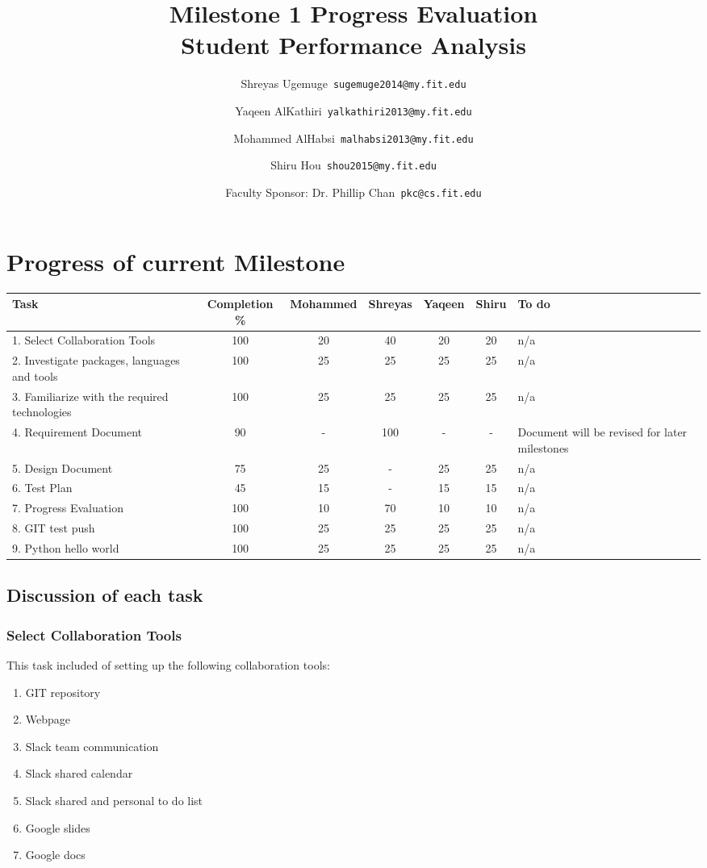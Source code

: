 \documentclass[12pt]{article}
\begin{document}
	\title{\textbf{Milestone 1 Progress Evaluation} \\ \hfill \break
	Student Performance Analysis}
	\author{Shreyas Ugemuge\      \texttt{sugemuge2014@my.fit.edu}
  \and
  Yaqeen AlKathiri\      \texttt{yalkathiri2013@my.fit.edu}
  \and
	Mohammed AlHabsi\      \texttt{malhabsi2013@my.fit.edu}
  \and
  Shiru Hou\      \texttt{shou2015@my.fit.edu}
  \and
  Faculty Sponsor: Dr. Phillip Chan\      \texttt{pkc@cs.fit.edu}}
	\maketitle
	\pagebreak
	\singlespacing
	\tableofcontents
	\pagebreak
	\section{Progress of current Milestone}
	\begin{tabularx}{\textwidth}{|X|c|c|c|c|c|X|}
	\hline
	\textbf{Task} & \textbf{Completion \%} & \textbf{Mohammed} & \textbf{Shreyas} & \textbf{Yaqeen} & \textbf{Shiru} & \textbf{To do} \\ \hline
	1. Select Collaboration Tools & 100 & 20 & 40 & 20 & 20 & n/a \\ \hline
	2. Investigate packages, languages and tools & 100 & 25 & 25 & 25 & 25 & n/a \\ \hline
	3. Familiarize with the required technologies & 100 & 25 & 25 & 25 & 25 & n/a \\ \hline
	4. Requirement Document & 90 & - & 100 & - & - & Document will be revised for later milestones \\ \hline
	5. Design Document & 75 & 25 & - & 25 & 25 & n/a \\ \hline
	6. Test Plan & 45 & 15 & - & 15 & 15 & n/a \\ \hline
	7. Progress Evaluation & 100 & 10 & 70 & 10 & 10 & n/a \\ \hline
	8. GIT test push & 100 & 25 & 25 & 25 & 25 & n/a \\ \hline
	9. Python hello world & 100 & 25 & 25 & 25 & 25 & n/a \\ \hline
	\end{tabularx}

	\subsection{Discussion of each task}
	\subsubsection{Select Collaboration Tools}
	This task included of setting up the following collaboration tools:
	\begin{enumerate}
		\item GIT repository
		\item Webpage
		\item Slack team communication
		\item Slack shared calendar
		\item Slack shared and personal to do list
		\item Google slides
		\item Google docs
	\end{enumerate}
\end{document}
